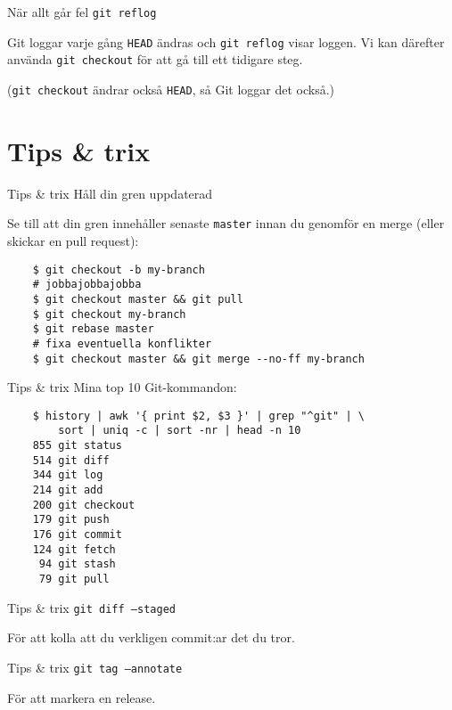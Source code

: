 \documentclass[11pt,xetex]{beamer}
\begin{document}
\begin{frame}{När allt går fel}
  \Large
  \texttt{git reflog}

  \normalsize
  Git loggar varje gång \texttt{HEAD} ändras och
  \texttt{git reflog} visar loggen. Vi kan därefter använda
  \texttt{git checkout} för att gå till ett tidigare steg.

  \scriptsize
  (\texttt{git checkout} ändrar också \texttt{HEAD}, så
  Git loggar det också.)
\end{frame}


\section*{Tips \& trix}

\begin{frame}[fragile]{Tips \& trix}
  \Large
  Håll din gren uppdaterad

  \normalsize
  Se till att din gren innehåller senaste \texttt{master} innan du
  genomför en merge (eller skickar en pull request):

  \begin{verbatim}
    $ git checkout -b my-branch
    # jobbajobbajobba
    $ git checkout master && git pull
    $ git checkout my-branch
    $ git rebase master
    # fixa eventuella konflikter
    $ git checkout master && git merge --no-ff my-branch
  \end{verbatim}
\end{frame}

\begin{frame}[fragile]{Tips \& trix}
  \Large
  Mina top 10 Git-kommandon:

  \begin{verbatim}
    $ history | awk '{ print $2, $3 }' | grep "^git" | \
        sort | uniq -c | sort -nr | head -n 10
    855 git status
    514 git diff
    344 git log
    214 git add
    200 git checkout
    179 git push
    176 git commit
    124 git fetch
     94 git stash
     79 git pull
  \end{verbatim}
\end{frame}

\begin{frame}{Tips \& trix}
  \Large
  \texttt{git diff --staged}

  \normalsize
  För att kolla att du verkligen commit:ar det du tror.
\end{frame}

\begin{frame}{Tips \& trix}
  \Large
  \texttt{git tag --annotate}

  \normalsize
  För att markera en release.
\end{frame}
\end{document}

